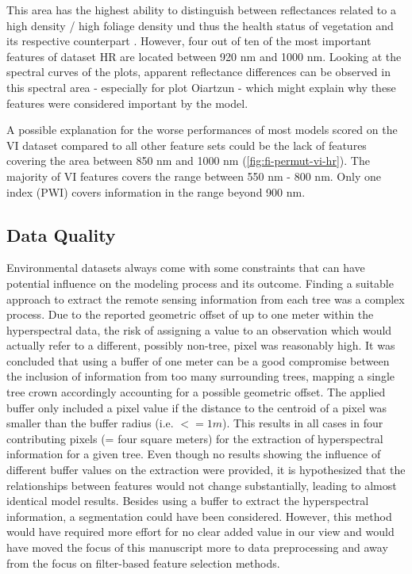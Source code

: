 \documentclass[final]{IEEEtran}
\begin{document}
This area has the highest ability to distinguish between reflectances related to a high density / high foliage density und thus the health status of vegetation and its respective counterpart \cite{horler1983}.
However, four out of ten of the most important features of dataset HR are located between 920 nm and 1000 nm.
Looking at the spectral curves of the plots, apparent reflectance differences can be observed in this spectral area - especially for plot Oiartzun - which might explain why these features were considered important by the model.

A possible explanation for the worse performances of most models scored on the VI dataset compared to all other feature sets could be the lack of features covering the area between 850 nm and 1000 nm (\autoref{fig:fi-permut-vi-hr}).
The majority of VI features covers the range between 550 nm - 800 nm.
Only one index (PWI) covers information in the range beyond 900 nm.

\subsection{Data Quality}
\label{subsec:data-quality}

Environmental datasets always come with some constraints that can have potential influence on the modeling process and its outcome.
Finding a suitable approach to extract the remote sensing information from each tree was a complex process.
Due to the reported geometric offset of up to one meter within the hyperspectral data, the risk of assigning a value to an observation which would actually refer to a different, possibly non-tree, pixel was reasonably high.
It was concluded that using a buffer of one meter can be a good compromise between the inclusion of information from too many surrounding trees, mapping a single tree crown accordingly accounting for a possible geometric offset.
The applied buffer only included a pixel value if the distance to the centroid of a pixel was smaller than the buffer radius (i.e. $<= 1m$).
This results in all cases in four contributing pixels (= four square meters) for the extraction of hyperspectral information for a given tree.
Even though no results showing the influence of different buffer values on the extraction were provided, it is hypothesized that the relationships between features would not change substantially, leading to almost identical model results.
Besides using a buffer to extract the hyperspectral information, a segmentation could have been considered.
However, this method would have required more effort for no clear added value in our view and would have moved the focus of this manuscript more to data preprocessing and away from the focus on filter-based feature selection methods.
\end{document}
